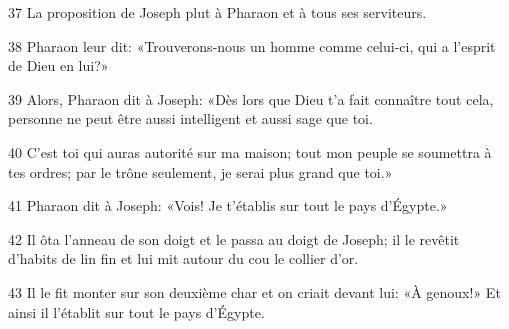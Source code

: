 37 La proposition de Joseph plut à Pharaon et à tous ses serviteurs.

38 Pharaon leur dit: «Trouverons-nous un homme comme celui-ci, qui a l’esprit de Dieu en lui?»

39 Alors, Pharaon dit à Joseph: «Dès lors que Dieu t’a fait connaître tout cela, personne ne peut être aussi intelligent et aussi sage que toi.

40 C’est toi qui auras autorité sur ma maison; tout mon peuple se soumettra à tes ordres; par le trône seulement, je serai plus grand que toi.»

41 Pharaon dit à Joseph: «Vois! Je t’établis sur tout le pays d’Égypte.»

42 Il ôta l’anneau de son doigt et le passa au doigt de Joseph; il le revêtit d’habits de lin fin et lui mit autour du cou le collier d’or.

43 Il le fit monter sur son deuxième char et on criait devant lui: «À genoux!» Et ainsi il l’établit sur tout le pays d’Égypte.